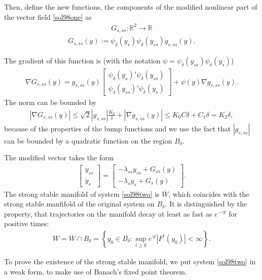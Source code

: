 \begin{solution}[9.8]
Then, define the new functions, the components of the modified nonlinear part of the vector field \eqref{sol98one} as 
\begin{align}
G_{s, ss}: \mathbb{R}^2 \to \mathbb{R}
\end{align}
\begin{align}
G_{s, ss}(y) := \psi_\delta(y_s)\psi_\delta(y_{ss})g_{s,ss}(y).
\end{align}

The gradient of this function is (with the notation $\psi = \psi_\delta(y_{ss})\psi_\delta(y_s)$)
\begin{align}
\nabla G_{s, ss}(y) = g_{s,ss}(y)\begin{bmatrix}\psi_\delta(y_s)'\psi_\delta(y_{ss}) \\ \psi_\delta(y_{ss})'\psi_\delta(y_s) \end{bmatrix} + \psi(y) \nabla g_{s,ss}(y).
\end{align}
The norm can be bounded by
\begin{align}
|\nabla G_{s, ss}(y) | \leq \sqrt{2}|g_{s,ss}|\frac{K_0}{\delta} + |\nabla g_{s,ss}(y)| \leq K_0 C \delta + C_1 \delta = K_2 \delta,
\end{align}
because of the properties of the bump functions and we use the fact that $|g_{s,ss}|$ can be bounded by a quadratic function on the region $B_\delta$. 

The modified vector takes the form  
\begin{align}
    \begin{bmatrix}
    \dot{y}_{ss} \\
    \dot{y}_{s} 
    \end{bmatrix} = \begin{bmatrix} -\lambda_{ss} y_{ss} + G_{ss}(y)\\ -\lambda_{s} y_{s} + G_{s}(y)\end{bmatrix}.
    \label{sol98two}
\end{align}
The strong stable manifold of system \eqref{sol98two} is $\overline{W}$, which coincides with the strong stable manfifold of the original system on $B_\delta$. It is distinguished by the property, that trajectories on the manifold decay at least as fast as $e^{-\gamma t}$ for positive times:
\begin{align}
W =\overline{W}\cap B_\delta = \left\{ y_0\in B_\delta : \sup_{t\geq 0} e^{\gamma t}|F^t(y_0)| < \infty \right \}.
\end{align}

To prove the existence of the strong stable manifold, we put system \eqref{sol98two} in a weak form, to make use of Banach's fixed point theorem. 


\end{solution}
